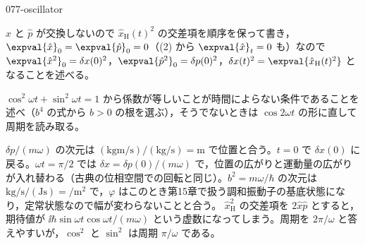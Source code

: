 \documentclass[uplatex,dvipdfmx,a4paper,11pt]{jsarticle}
\begin{document}
\begin{kaisetsu}{077-oscillator}
\begin{ronten}
  \item {} $\hat{x}$ と $\hat{p}$ が交換しないので $\hat{x}_{\mathrm{H}}(t)^{2}$ の交差項を順序を保って書き，$\expval{\hat{x}}_{0}=\expval{\hat{p}}_{0}=0$（(2) から $\expval{\hat{x}}_{t}=0$ も）なので $\expval{\hat{x}^{2}}_{0}=\delta x(0)^{2}$，$\expval{\hat{p}^{2}}_{0}=\delta p(0)^{2}$，$\delta x(t)^{2}=\expval{\hat{x}_{\mathrm{H}}(t)^{2}}$ となることを述べる。
  \item {} $\cos^{2}\omega t+\sin^{2}\omega t=1$ から係数が等しいことが時間によらない条件であることを述べ（$b^{4}$ の式から $b>0$ の根を選ぶ），そうでないときは $\cos2\omega t$ の形に直して周期を読み取る。
\end{ronten}
\kenzan $\delta p/(m\omega)$ の次元は $(\unit{\kilogram\metre\per\second})/(\unit{\kilogram\per\second})=\unit{\metre}$ で位置と合う。$t=0$ で $\delta x(0)$ に戻る。$\omega t=\pi/2$ では $\delta x=\delta p(0)/(m\omega)$ で，位置の広がりと運動量の広がりが入れ替わる（古典の位相空間での回転と同じ）。$b^{2}=m\omega/\hbar$ の次元は $\unit{\kilogram\per\second}/(\unit{\joule\second})=\unit{\per\metre\squared}$ で，$\varphi$ はこのとき第15章で扱う調和振動子の基底状態になり，定常状態なので幅が変わらないことと合う。
\tsumazuki $\hat{x}_{\mathrm{H}}^{2}$ の交差項を $2\hat{x}\hat{p}$ とすると，期待値が $\ii\hbar\sin\omega t\cos\omega t/(m\omega)$ という虚数になってしまう。周期を $2\pi/\omega$ と答えやすいが，$\cos^{2}$ と $\sin^{2}$ は周期 $\pi/\omega$ である。
\end{kaisetsu}
\end{document}
